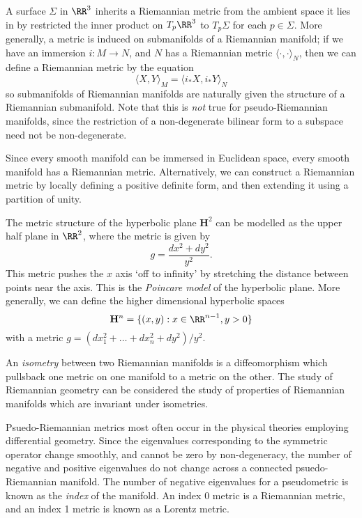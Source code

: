 \begin{example}
    A surface $\Sigma$ in $\RR^3$ inherits a Riemannian metric from the ambient space it lies in by restricted the inner product on $T_p \RR^3$ to $T_p \Sigma$ for each $p \in \Sigma$. More generally, a metric is induced on submanifolds of a Riemannian manifold; if we have an immersion $i: M \to N$, and $N$ has a Riemannian metric $\langle \cdot, \cdot \rangle_N$, then we can define a Riemannian metric by the equation
    \[ \langle X, Y \rangle_M = \langle i_*X, i_*Y \rangle_N \]
    so submanifolds of Riemannian manifolds are naturally given the structure of a Riemannian submanifold. Note that this is \emph{not} true for pseudo-Riemannian manifolds, since the restriction of a non-degenerate bilinear form to a subspace need not be non-degenerate.
\end{example}

Since every smooth manifold can be immersed in Euclidean space, every smooth manifold has a Riemannian metric. Alternatively, we can construct a Riemannian metric by locally defining a positive definite form, and then extending it using a partition of unity.

\begin{example}
    The metric structure of the hyperbolic plane $\mathbf{H}^2$ can be modelled as the upper half plane in $\RR^2$, where the metric is given by
    \[ g = \frac{dx^2 + dy^2}{y^2}. \]
    This metric pushes the $x$ axis `off to infinity' by stretching the distance between points near the axis. This is the \emph{Poincare model} of the hyperbolic plane. More generally, we can define the higher dimensional hyperbolic spaces
    \[ \mathbf{H}^n = \{ (x,y): x \in \RR^{n-1}, y > 0 \} \]
    with a metric $g = (dx_1^2 + \dots + dx_n^2 + dy^2) / y^2$.
\end{example}

An \emph{isometry} between two Riemannian manifolds is a diffeomorphism which pullsback one metric on one manifold to a metric on the other. The study of Riemannian geometry can be considered the study of properties of Riemannian manifolds which are invariant under isometries.

Psuedo-Riemannian metrics most often occur in the physical theories employing differential geometry. Since the eigenvalues corresponding to the symmetric operator change smoothly, and cannot be zero by non-degeneracy, the number of negative and positive eigenvalues do not change across a connected psuedo-Riemannian manifold. The number of negative eigenvalues for a pseudometric is known as the \emph{index} of the manifold. An index 0 metric is a Riemannian metric, and an index 1 metric is known as a Lorentz metric. 

